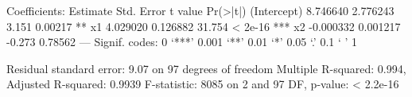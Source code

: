 Coefficients:
             Estimate Std. Error t value Pr(>|t|)    
(Intercept)  8.746640   2.776243   3.151  0.00217 ** 
x1           4.029020   0.126882  31.754  < 2e-16 ***
x2          -0.000332   0.001217  -0.273  0.78562    
---
Signif. codes:  0 ‘***’ 0.001 ‘**’ 0.01 ‘*’ 0.05 ‘.’ 0.1 ‘ ’ 1

Residual standard error: 9.07 on 97 degrees of freedom
Multiple R-squared:  0.994,	Adjusted R-squared:  0.9939 
F-statistic:  8085 on 2 and 97 DF,  p-value: < 2.2e-16

